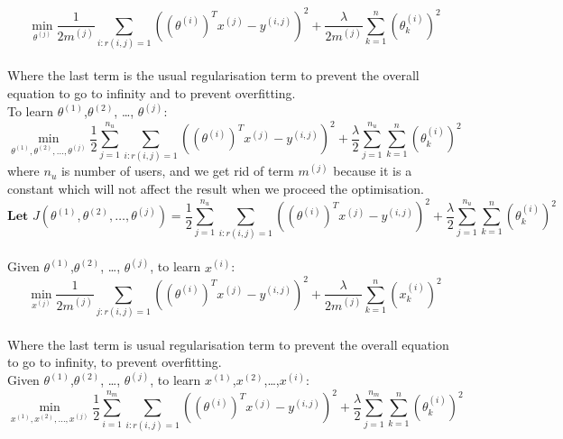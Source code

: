 \begin{equation*}
\min_{\theta^{(j)}} \frac{1}{2m^{(j)}}\sum_{i:r(i,j) = 1}\left((\theta^{(i)})^{T}x^{(j)}-y^{(i,j)}\right)^{2} + \frac{\lambda}{2m^{(j)}}\sum_{k = 1}^{n}(\theta^{(i)}_{k})^{2}
\end{equation*}
\\Where the last term is the usual regularisation term to prevent the overall equation to go to infinity and to prevent overfitting.
\\ To learn $\theta^{(1)}$,$\theta^{(2)}$, \dots, $\theta^{(j)}$:
\begin{equation*}
\min_{\theta^{(1)},\theta^{(2)}, \dots, \theta^{(j)}} \frac{1}{2}\sum_{j = 1}^{n_{u}}\sum_{i:r(i,j) = 1}\left((\theta^{(i)})^{T}x^{(j)}-y^{(i,j)}\right)^{2} + \frac{\lambda}{2}\sum_{j = 1}^{n_{u}}\sum_{k = 1}^{n}(\theta^{(i)}_{k})^{2}
\end{equation*}
where $n_{u}$ is number of users, and we get rid of term $m^{(j)}$ because it is a constant which will not affect the result when we proceed the optimisation.
\begin{equation*}
\textbf{Let     } J(\theta^{(1)},\theta^{(2)}, \dots, \theta^{(j)}) = \frac{1}{2}\sum_{j = 1}^{n_{u}}\sum_{i:r(i,j) = 1}\left((\theta^{(i)})^{T}x^{(j)}-y^{(i,j)}\right)^{2} + \frac{\lambda}{2}\sum_{j = 1}^{n_{u}}\sum_{k = 1}^{n}(\theta^{(i)}_{k})^{2}
\end{equation*}
\\Given $\theta^{(1)}$,$\theta^{(2)}$, \dots, $\theta^{(j)}$, to learn $x^{(i)}$:
\begin{equation*}
\min_{x^{(j)}} \frac{1}{2m^{(j)}}\sum_{j:r(i,j) = 1}\left((\theta^{(i)})^{T}x^{(j)}-y^{(i,j)}\right)^{2} + \frac{\lambda}{2m^{(j)}}\sum_{k = 1}^{n}(x^{(i)}_{k})^{2}
\end{equation*}
\\Where the last term is usual regularisation term to prevent the overall equation to go to infinity, to prevent overfitting.
\\Given $\theta^{(1)}$,$\theta^{(2)}$, \dots, $\theta^{(j)}$, to learn $x^{(1)}$,$x^{(2)}$,\dots,$x^{(i)}$:
\begin{equation*}
\min_{x^{(1)},x^{(2)}, \dots,x^{(j)}} \frac{1}{2}\sum_{i = 1}^{n_{m}}\sum_{i:r(i,j) = 1}\left((\theta^{(i)})^{T}x^{(j)}-y^{(i,j)}\right)^{2} + \frac{\lambda}{2}\sum_{j = 1}^{n_{m}}\sum_{k = 1}^{n}(\theta^{(i)}_{k})^{2}
\end{equation*}
